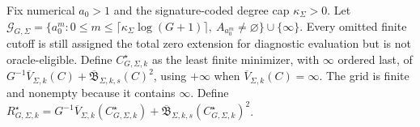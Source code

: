 Fix numerical \(a_0>1\) and the signature-coded degree cap \(\kappa_\Sigma>0\). Let \(\mathcal G_{G,\Sigma}=\{a_0^m:0\le m\le\lceil\kappa_\Sigma\log(G+1)\rceil,\ A_{a_0^m}\ne\varnothing\}\cup\{\infty\}\). Every omitted finite cutoff is still assigned the total zero extension for diagnostic evaluation but is not oracle-eligible. Define \(C_{G,\Sigma,k}^{\star}\) as the least finite minimizer, with \(\infty\) ordered last, of \(G^{-1}\overline V_{\Sigma,k}(C)+\overline{\mathfrak B}_{\Sigma,k,s}(C)^2\), using \(+\infty\) when \(\overline V_{\Sigma,k}(C)=\infty\). The grid is finite and nonempty because it contains \(\infty\). Define \(R_{G,\Sigma,k}^{\star}=G^{-1}\overline V_{\Sigma,k}(C_{G,\Sigma,k}^{\star})+\overline{\mathfrak B}_{\Sigma,k,s}(C_{G,\Sigma,k}^{\star})^2\).